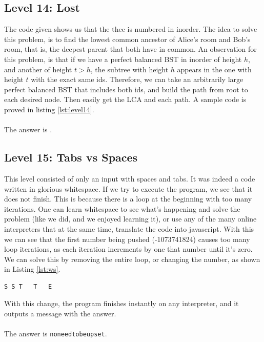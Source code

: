\documentclass[paper=a4, fontsize=11pt]{scrartcl}	%
\begin{document}
\subsection*{Level 14: Lost}
The code given shows us that the thee is numbered in inorder. The idea to solve this problem, is to find the lowest common ancestor of Alice's room and Bob's room, that is, the deepest parent that both have in common. An observation for this problem, is that if we have a perfect balanced BST in inorder of height $h$, and another of height $t > h$, the subtree with height $h$ appears in the one with height $t$ with the exact same ids. Therefore, we can take an arbitrarily large perfect balanced BST that includes both ids, and build the path from root to each desired node. Then easily get the LCA and each path.
A sample code is proved in listing \ref{lst:level14}.
\\
\\
The answer is 
\texttt{}.




\subsection*{Level 15: Tabs vs Spaces}
This level consisted of only an input with spaces and tabs. It was indeed a code written in glorious whitespace. If we try to execute the program, we see that it does not finish. This is because there is a loop at the beginning with too many iterations. One can learn whitespace to see what's happening and solve the problem (like we did, and we enjoyed learning it), or use any of the many online interpreters that at the same time, translate the code into javascript. With this we can see that the first number being pushed (-1073741824) causes too many loop iterations, as each iteration increments by one that number until it's zero. We can solve this by removing the entire loop, or changing the number, as shown in Listing \ref{lst:ws}.
\begin{lstlisting}[firstnumber=1, caption={Change of the first line.}, label={lst:ws}]
S S T	T	E
\end{lstlisting}
With this change, the program finishes instantly on any interpreter, and it outputs a message with the answer.
\\
\\
The answer is \texttt{noneedtobeupset}.
\end{document}
